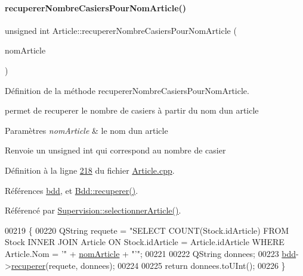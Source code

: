\paragraph{\texorpdfstring{recuperer\+Nombre\+Casiers\+Pour\+Nom\+Article()}{recupererNombreCasiersPourNomArticle()}}
{\footnotesize\ttfamily unsigned int Article\+::recuperer\+Nombre\+Casiers\+Pour\+Nom\+Article (\begin{DoxyParamCaption}\item[{Q\+String}]{nom\+Article }\end{DoxyParamCaption})\hspace{0.3cm}{\ttfamily [static]}}



Définition de la méthode recuperer\+Nombre\+Casiers\+Pour\+Nom\+Article. 

permet de recuperer le nombre de casiers à partir du nom d\textquotesingle{}un article 
\begin{DoxyParams}{Paramètres}
{\em nom\+Article} & le nom d\textquotesingle{}un article \\
\hline
\end{DoxyParams}
\begin{DoxyReturn}{Renvoie}
un unsigned int qui correspond au nombre de casier 
\end{DoxyReturn}


Définition à la ligne \hyperlink{_article_8cpp_source_l00218}{218} du fichier \hyperlink{_article_8cpp_source}{Article.\+cpp}.



Références \hyperlink{_article_8h_source_l00082}{bdd}, et \hyperlink{_bdd_8cpp_source_l00187}{Bdd\+::recuperer()}.



Référencé par \hyperlink{_supervision_8cpp_source_l00320}{Supervision\+::selectionner\+Article()}.


\begin{DoxyCode}
00219 \{
00220     QString requete = \textcolor{stringliteral}{"SELECT COUNT(Stock.idArticle) FROM Stock INNER JOIN Article ON Stock.idArticle =
       Article.idArticle WHERE Article.Nom = '"} + \hyperlink{class_article_a0ba6c08f7dd54e4b7caf673ecd6b41a6}{nomArticle} + \textcolor{stringliteral}{"'"};
00221 
00222     QString donnees;
00223     \hyperlink{class_article_a7221cec4212d86d74f479b9ee683ee8a}{bdd}->\hyperlink{class_bdd_a8f25d29d309041bbf875700db0efd97b}{recuperer}(requete, donnees);
00224 
00225     \textcolor{keywordflow}{return} donnees.toUInt();
00226 \}
\end{DoxyCode}
\mbox{\label{class_article_aa7aeaee7858b50714e9c022899b9b82d}} 
